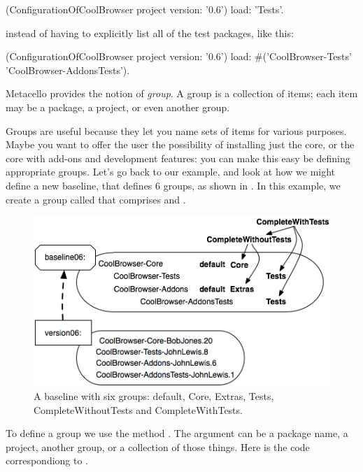 \documentclass[a4paper,10pt,twoside]{book}
\begin{document}
\begin{code}{}
(ConfigurationOfCoolBrowser project version: '0.6') load: 'Tests'.
\end{code}

instead of having to explicitly list all of the test packages, like this:
 
\begin{code}{} 
(ConfigurationOfCoolBrowser project version: '0.6') 
       load: #('CoolBrowser-Tests' 'CoolBrowser-AddonsTests').
\end{code}
 
Metacello provides the notion of \emph{group}. A group is a collection of items; each item may be a package, a project, or even another group.  
 
Groups are useful because they let you name sets of items for various purposes. Maybe you want to offer the  user the possibility of installing just the core, or the core with add-ons and development features: you can make this easy be defining appropriate groups.  Let's go back to our example, and look at how we might define a new baseline,  that defines 6 groups, as shown in . In this example, we create a group called  that comprises  and . 


\begin{figure}
\begin{center}
\includegraphics[width=0.9\linewidth]{version06}
\caption{A baseline with six groups: default, Core, Extras, Tests, CompleteWithoutTests and CompleteWithTests.\label{fig:version06}}
\end{center}
\end{figure} 


To define a group we use the method \mbox{.} The  argument can be a package name, a project, another group, or a collection of those things.  Here is the code correspondiong to .
\end{document}
